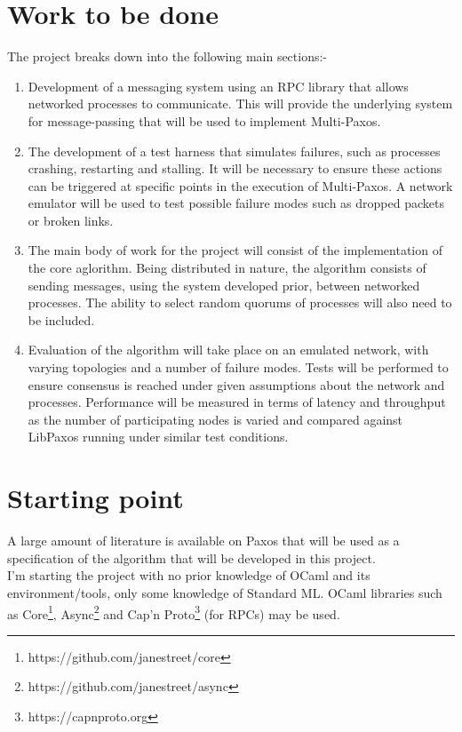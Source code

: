 \section*{Work to be done}
The project breaks down into the following main sections:-
\begin{enumerate}

\item Development of a messaging system using an RPC library that allows networked processes to communicate. This will provide the underlying system for message-passing that will be used to implement Multi-Paxos.

\item The development of a test harness that simulates failures, such as processes crashing, restarting and stalling. It will be necessary to ensure these actions can be triggered at specific points in the execution of Multi-Paxos. A network emulator will be used to test possible failure modes such as dropped packets or broken links.

\item The main body of work for the project will consist of the implementation of the core aglorithm. Being distributed in nature, the algorithm consists of sending messages, using the system developed prior, between networked processes. The ability to select random quorums of processes will also need to be included.

\item Evaluation of the algorithm will take place on an emulated network, with varying topologies and a number of failure modes. Tests will be performed to ensure consensus is reached under given assumptions about the network and processes. Performance will be measured in terms of latency and throughput as the number of participating nodes is varied and compared against LibPaxos running under similar test conditions.
\end{enumerate}

\section*{Starting point}
A large amount of literature is available on Paxos that will be used as a specification of the algorithm that will be developed in this project. \\

I'm starting the project with no prior knowledge of OCaml and its environment/tools, only some knowledge of Standard ML. OCaml libraries such as Core\footnote{https://github.com/janestreet/core}, Async\footnote{https://github.com/janestreet/async} and Cap'n Proto\footnote{https://capnproto.org} (for RPCs) may be used. \\

